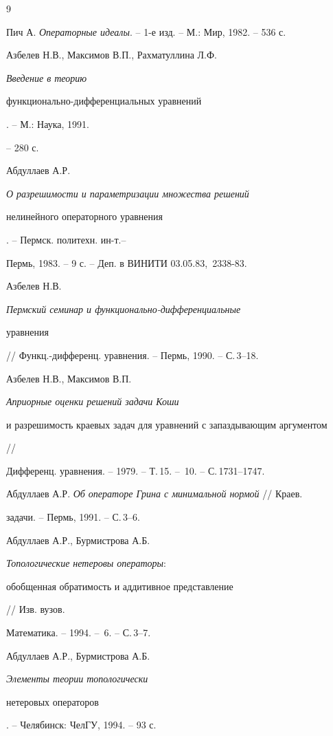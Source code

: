 \begin{thebibliography}{9} 


 




Пич А. {\em Операторные идеалы}. -- 1-е изд. -- М.: Мир, 1982. -- 536 с. 




Азбелев Н.В., Максимов В.П., Рахматуллина Л.Ф. {\em Введение в теорию 


функционально-дифференциальных уравнений}. -- М.: Наука, 1991. 


-- 280 с. 




Абдуллаев А.Р. {\em О разрешимости и параметризации множества решений 


нелинейного операторного уравнения}. -- Пермск. политехн. ин-т.-- 


Пермь, 1983. -- 9 с. -- Деп. в ВИНИТИ 03.05.83, \No\,2338-83. 




Азбелев Н.В. {\em Пермский семинар и функционально-дифференциальные  


уравнения} // Функц.-дифференц. уравнения. -- Пермь, 1990. -- С.\,3--18. 




Азбелев Н.В., Максимов В.П. {\em Априорные оценки решений задачи Коши 


и разрешимость краевых задач для уравнений с запаздывающим аргументом} // 


Дифференц. уравнения. -- 1979. -- Т.\,15. -- \No\,10. -- С.\,1731--1747. 




Абдуллаев А.Р. {\em Об операторе Грина с минимальной нормой} // Краев.  


задачи. -- Пермь, 1991. -- С.\,3--6. 




Абдуллаев А.Р., Бурмистрова А.Б. {\em Топологические нетеровы операторы$:$ 


обобщенная обратимость и аддитивное представление} // Изв. вузов.  


Математика. -- 1994. -- \No\,6. -- С.\,3--7. 




Абдуллаев А.Р., Бурмистрова А.Б. {\em Элементы теории топологически  


нетеровых операторов}. -- Челябинск: ЧелГУ, 1994. -- 93 с. 


 


\end{thebibliography} 


 


\vskip 2cm 


 






 


\label{end} 


 


